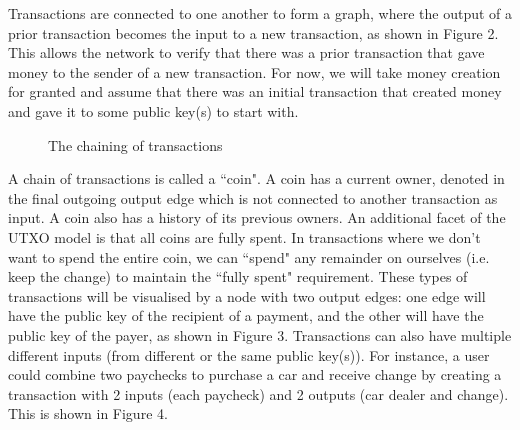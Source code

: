 Transactions are connected to one another to form a graph, where the output of a prior transaction becomes the input to a new transaction, as shown in Figure 2. This allows the network to verify that there was a prior transaction that gave money to the sender of a new transaction. For now, we will take money creation for granted and assume that there was an initial transaction that created money and gave it to some public key(s) to start with.
\begin{figure}[h]
\begin{center}
\end{center}
\caption{The chaining of transactions}
\label{fig:tx_model}
\end{figure}

A chain of transactions is called a ``coin". A coin has a
current owner, denoted in the final outgoing output edge which is not connected to another transaction as input. A coin also has a history of its previous owners. An additional facet of the UTXO model is that all coins are fully spent. In transactions where we don't want to spend the entire coin, we can ``spend" any remainder on ourselves (i.e. keep the change) to maintain the ``fully spent" requirement. These types of transactions will be visualised by a node with two output edges: one edge will have the public key of the recipient of a payment, and the other will have the public key of the payer, as shown in Figure 3. Transactions can also have multiple different inputs (from different or the same public key(s)). For instance, a user could combine two paychecks to purchase a car and receive change by creating a transaction with 2 inputs (each paycheck) and 2 outputs (car dealer and change). This is shown in Figure 4.

